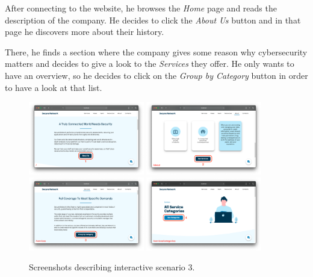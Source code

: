 \documentclass[12pt]{report}
\begin{document}
After connecting to the website, he browses the \emph{Home} page and reads the description of the company. 
He decides to click the \emph{About Us} button and in that page he discovers more about their history.

There, he finds a section where the company gives some reason why cybersecurity matters and decides to give a look to the \emph{Services} they offer.
He only wants to have an overview, so he decides to click on the \emph{Group by Category} button in order to have a look at that list.

\begin{figure}[H]
	\centering
	\includegraphics[width=0.45\textwidth]{scenarios/3/1.png}
	\includegraphics[width=0.45\textwidth]{scenarios/3/2.png}
	\includegraphics[width=0.45\textwidth]{scenarios/3/3.png}
	\includegraphics[width=0.45\textwidth]{scenarios/3/4.png}
	\caption{Screenshots describing interactive scenario 3.}
\end{figure}
\end{document}
